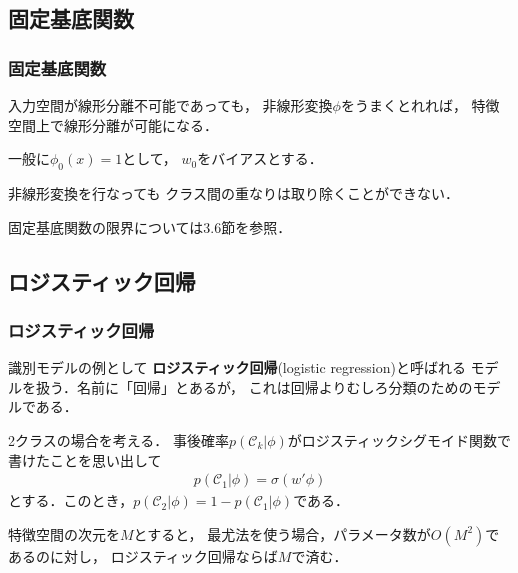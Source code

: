 \documentclass[10pt,%
hyperref={unicode}]{beamer}
\newenvironment{wideitemize}{\itemize\addtolength{\itemsep}{1em}}{\enditemize}
\begin{document}
\subsection{固定基底関数}
\begin{frame}
    \frametitle{固定基底関数}
    \begin{wideitemize}
        \item 入力空間が線形分離不可能であっても，
            非線形変換$\phi$をうまくとれれば，
            特徴空間上で線形分離が可能になる．

        \item 一般に$\phi_0(x) = 1$として，
            $w_0$をバイアスとする．

        \item 非線形変換を行なっても
            クラス間の重なりは取り除くことができない．

        \item 固定基底関数の限界については3.6節を参照．
    \end{wideitemize}
\end{frame}

\subsection{ロジスティック回帰}
\begin{frame}
    \frametitle{ロジスティック回帰}
    識別モデルの例として
    \textbf{ロジスティック回帰}(logistic regression)と呼ばれる
    モデルを扱う．名前に「回帰」とあるが，
    これは回帰よりむしろ分類のためのモデルである．

    \bigskip

    2クラスの場合を考える．
    事後確率$p(\mathcal{C}_k|\phi)$がロジスティックシグモイド関数で
    書けたことを思い出して
    \begin{align}
        p(\mathcal{C}_1|\phi) = \sigma(w'\phi) \tag{4.87}
    \end{align}
    とする．このとき，$p(\mathcal{C}_2|\phi)=1 - p(\mathcal{C}_1|\phi)$である．

    \bigskip

    特徴空間の次元を$M$とすると，
    最尤法を使う場合，パラメータ数が$O(M^2)$であるのに対し，
    ロジスティック回帰ならば$M$で済む．
\end{frame}
\end{document}

